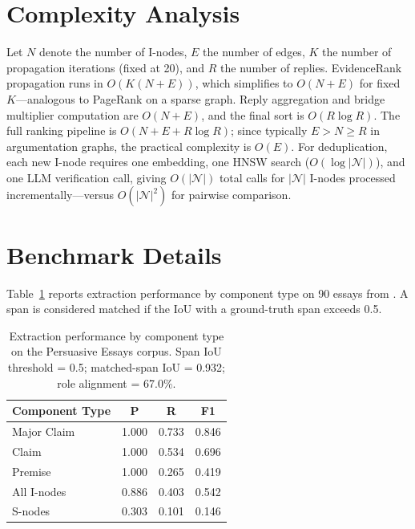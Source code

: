 
\section{Complexity Analysis}
\label{app:architecture}

Let $N$ denote the number of I-nodes, $E$ the number of edges, $K$ the number of propagation iterations (fixed at 20), and $R$ the number of replies. EvidenceRank propagation runs in $O(K(N + E))$, which simplifies to $O(N + E)$ for fixed $K$---analogous to PageRank on a sparse graph. Reply aggregation and bridge multiplier computation are $O(N + E)$, and the final sort is $O(R \log R)$. The full ranking pipeline is $O(N + E + R \log R)$; since typically $E > N \geq R$ in argumentation graphs, the practical complexity is $O(E)$. For deduplication, each new I-node requires one embedding, one HNSW search ($O(\log |\mathcal{N}|)$), and one LLM verification call, giving $O(|\mathcal{N}|)$ total calls for $|\mathcal{N}|$ I-nodes processed incrementally---versus $O(|\mathcal{N}|^2)$ for pairwise comparison.

\section{Benchmark Details}
\label{app:benchmarks}

Table~\ref{tab:extraction} reports extraction performance by component type on 90 essays from \citet{stab-gurevych-2014-annotating}. A span is considered matched if the IoU with a ground-truth span exceeds 0.5.

\begin{table}[ht]
\centering
\small
\begin{tabular}{lccc}
\toprule
\textbf{Component Type} & \textbf{P} & \textbf{R} & \textbf{F1} \\
\midrule
Major Claim & 1.000 & 0.733 & 0.846 \\
Claim       & 1.000 & 0.534 & 0.696 \\
Premise     & 1.000 & 0.265 & 0.419 \\
\midrule
All I-nodes & 0.886 & 0.403 & 0.542 \\
S-nodes     & 0.303 & 0.101 & 0.146 \\
\bottomrule
\end{tabular}
\caption{Extraction performance by component type on the Persuasive Essays corpus. Span IoU threshold = 0.5; matched-span IoU = 0.932; role alignment = 67.0\%.}
\label{tab:extraction}
\end{table}


